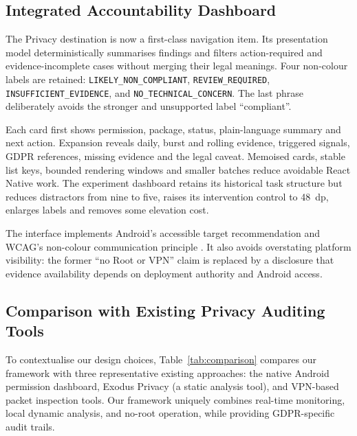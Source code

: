 \subsection{Integrated Accountability Dashboard}

The Privacy destination is now a first-class navigation item. Its presentation model deterministically summarises findings and filters action-required and evidence-incomplete cases without merging their legal meanings. Four non-colour labels are retained: \texttt{LIKELY\_NON\_COMPLIANT}, \texttt{REVIEW\_REQUIRED}, \texttt{INSUFFICIENT\_EVIDENCE}, and \texttt{NO\_TECHNICAL\_CONCERN}. The last phrase deliberately avoids the stronger and unsupported label ``compliant''.

Each card first shows permission, package, status, plain-language summary and next action. Expansion reveals daily, burst and rolling evidence, triggered signals, GDPR references, missing evidence and the legal caveat. Memoised cards, stable list keys, bounded rendering windows and smaller batches reduce avoidable React Native work. The experiment dashboard retains its historical task structure but reduces distractors from nine to five, raises its intervention control to 48~dp, enlarges labels and removes some elevation cost.

The interface implements Android's accessible target recommendation and WCAG's non-colour communication principle \cite{androidaccess,wcag22}. It also avoids overstating platform visibility: the former ``no Root or VPN'' claim is replaced by a disclosure that evidence availability depends on deployment authority and Android access.

\subsection{Comparison with Existing Privacy Auditing Tools}

To contextualise our design choices, Table~\ref{tab:comparison} compares our framework with three representative existing approaches: the native Android permission dashboard, Exodus Privacy (a static analysis tool), and VPN-based packet inspection tools. Our framework uniquely combines real-time monitoring, local dynamic analysis, and no-root operation, while providing GDPR-specific audit trails.

